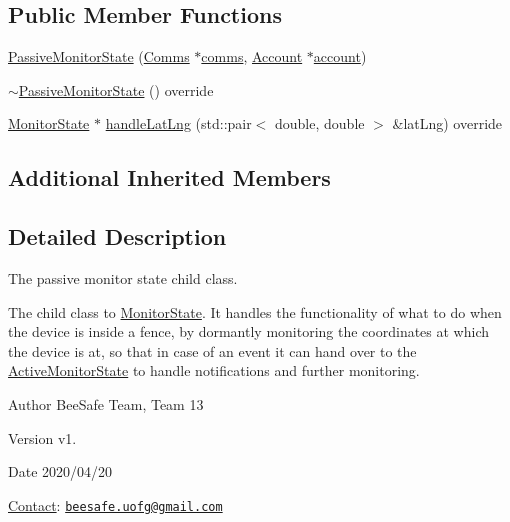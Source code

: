 \subsection*{Public Member Functions}
\begin{DoxyCompactItemize}
\item 
\hyperlink{class_passive_monitor_state_a91d992e619e8e1d3d47875a1933542b7}{Passive\+Monitor\+State} (\hyperlink{class_comms}{Comms} $\ast$\hyperlink{class_monitor_state_a41914e9963c67ef2d17774f04bad3518}{comms}, \hyperlink{class_account}{Account} $\ast$\hyperlink{class_monitor_state_a41128d4942ec0d5b107c63d1d95af811}{account})
\item 
\hyperlink{class_passive_monitor_state_a43a2e90a01187c40513899e4f9b5d804}{$\sim$\+Passive\+Monitor\+State} () override
\item 
\hyperlink{class_monitor_state}{Monitor\+State} $\ast$ \hyperlink{class_passive_monitor_state_a173a7c8a4d0b8ecea5928e0c90dec26b}{handle\+Lat\+Lng} (std\+::pair$<$ double, double $>$ \&lat\+Lng) override
\end{DoxyCompactItemize}
\subsection*{Additional Inherited Members}


\subsection{Detailed Description}
The passive monitor state child class. 

The child class to \hyperlink{class_monitor_state}{Monitor\+State}. It handles the functionality of what to do when the device is inside a fence, by dormantly monitoring the coordinates at which the device is at, so that in case of an event it can hand over to the \hyperlink{class_active_monitor_state}{Active\+Monitor\+State} to handle notifications and further monitoring.

\begin{DoxyAuthor}{Author}
Bee\+Safe Team, Team 13
\end{DoxyAuthor}
\begin{DoxyVersion}{Version}
v1.
\end{DoxyVersion}
\begin{DoxyDate}{Date}
2020/04/20
\end{DoxyDate}
\hyperlink{class_contact}{Contact}\+: \href{mailto:beesafe.uofg@gmail.com}{\tt beesafe.\+uofg@gmail.\+com}

